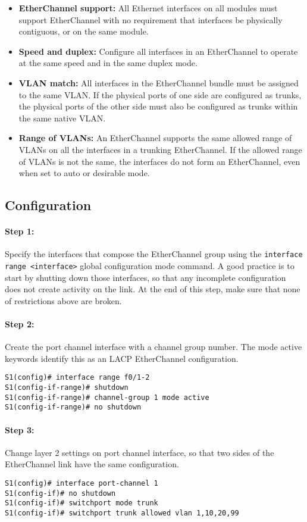 \begin{itemize}
\item \textbf{EtherChannel support:} All Ethernet interfaces on all modules must support EtherChannel with no requirement that interfaces be physically contiguous, or on the same module.

\item \textbf{Speed and duplex:} Configure all interfaces in an EtherChannel to operate at the same speed and in the same duplex mode.

\item \textbf{VLAN match:} All interfaces in the EtherChannel bundle must be assigned to the same VLAN. If the physical ports of one side are configured as trunks, the physical ports of the other side must also be configured as trunks within the same native VLAN.

\item \textbf{Range of VLANs:} An EtherChannel supports the same allowed range of VLANs on all the interfaces in a trunking EtherChannel. If the allowed range of VLANs is not the same, the interfaces do not form an EtherChannel, even when set to auto or desirable mode.
\end{itemize}

\subsection{Configuration}

\paragraph{Step 1:} Specify the interfaces that compose the EtherChannel group using the \verb|interface range <interface>| global configuration mode command. A good practice is to start by shutting down those interfaces, so that any incomplete configuration does not create activity on the link. At the end of this step, make sure that none of restrictions above are broken.

\paragraph{Step 2:} Create the port channel interface with a channel group number. The mode active keywords identify this as an LACP EtherChannel configuration.

\begin{verbatim}
S1(config)# interface range f0/1-2
S1(config-if-range)# shutdown
S1(config-if-range)# channel-group 1 mode active
S1(config-if-range)# no shutdown
\end{verbatim}

\paragraph{Step 3:} Change layer 2 settings on port channel interface, so that two sides of the EtherChannel link have the same configuration.

\begin{verbatim}
S1(config)# interface port-channel 1
S1(config-if)# no shutdown
S1(config-if)# switchport mode trunk
S1(config-if)# switchport trunk allowed vlan 1,10,20,99
\end{verbatim}
